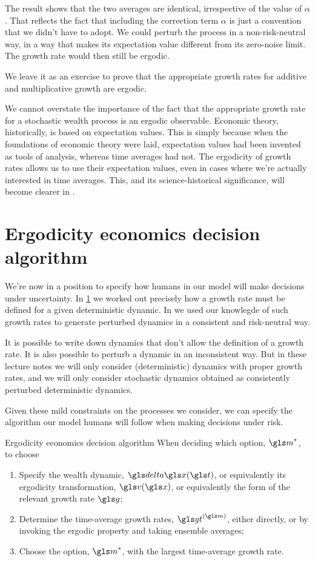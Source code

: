 The result shows that the two averages are identical, irrespective of the value of $\alpha$. That reflects the fact that including the correction term $\alpha$ is just  a convention that we didn't have to adopt. We could perturb the process in a non-risk-neutral way, \ie in a way that makes its expectation value different from its zero-noise limit. The growth rate would then still be ergodic.

We leave it as an exercise to prove that the appropriate growth rates for additive and multiplicative growth are ergodic.

We cannot overstate the importance of the fact that the appropriate growth rate for a stochastic wealth process is an ergodic observable. Economic theory, historically, is based on expectation values. This is simply because when the foundations of economic theory were laid, expectation values had been invented as tools of analysis, whereas time averages had not. The ergodicity of growth rates allows us to use their expectation values, even in cases where we're actually interested in time averages. This, and its science-historical significance, will become clearer in .

\section{Ergodicity economics decision algorithm}
We're now in a position to specify how humans in our model will make decisions under uncertainty. 
In \cref{} we worked out precisely how a growth rate must be defined for a given deterministic dynamic. In \secref{} 
we used our knowlegde of such growth rates to generate perturbed dynamics in a consistent and risk-neutral way. 
 
It is possible to write down dynamics that don't allow the definition of a growth rate. It is also possible to perturb a dynamic in an inconsistent way. But
in these lecture notes we will only consider (deterministic) dynamics with proper growth rates, and we will only consider stochastic dynamics obtained
as consistently perturbed deterministic dynamics.

Given these mild constraints on the processes we consider, we can specify the algorithm our model humans will follow when making decisions under risk.

\begin{keypts}{Ergodicity economics decision algorithm}
When deciding which option, $\m^*$, to choose
\begin{enumerate}
\item Specify the wealth dynamic, $\d\x(\t)$, or equivalently its ergodicity transformation, $\gv(\x)$, or equivalently the form of the relevant growth rate $\g$;
\item Determine the time-average growth rates, $\gt^{(\m)}$, either directly, or by invoking the 
ergodic property and taking ensemble averages;
\item Choose the option, $\m^*$, with the largest time-average growth rate.
\end{enumerate}
\end{keypts}



